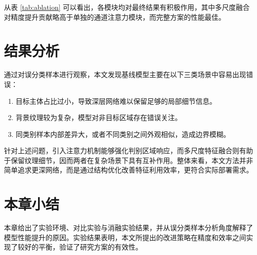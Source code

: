 从表 \ref{tab:ablation} 可以看出，各模块均对最终结果有积极作用，其中多尺度融合对精度提升贡献略高于单独的通道注意力模块，而完整方案的性能最佳。

\section{结果分析}

通过对误分类样本进行观察，本文发现基线模型主要在以下三类场景中容易出现错误：

\begin{enumerate}
  \item 目标主体占比过小，导致深层网络难以保留足够的局部细节信息。
  \item 背景纹理较为复杂，模型对非目标区域存在错误关注。
  \item 同类别样本内部差异大，或者不同类别之间外观相似，造成边界模糊。
\end{enumerate}

针对上述问题，引入注意力机制能够强化判别区域响应，而多尺度特征融合则有助于保留纹理细节，因而两者在复杂场景下具有互补作用。整体来看，本文方法并非简单追求更深网络，而是通过结构优化改善特征利用效率，更符合实际部署需求。

\section{本章小结}

本章给出了实验环境、对比实验与消融实验结果，并从误分类样本分析角度解释了模型性能提升的原因。实验结果表明，本文所提出的改进策略在精度和效率之间实现了较好的平衡，验证了研究方案的有效性。

